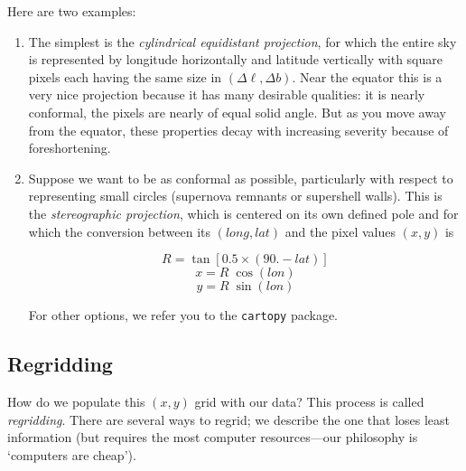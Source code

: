 \documentclass[psfig,preprint]{aastex}
\begin{document}
Here are two examples:
\begin{enumerate}

\item The simplest is the {\it cylindrical
equidistant projection}, for which the entire sky is represented by
longitude horizontally and latitude vertically with square pixels each
having the same size in $(\Delta \ell, \Delta b)$. Near the equator this
is a very nice projection because it has many desirable qualities: it
is nearly conformal, the pixels are nearly of equal solid angle. But as
you move away from the equator, these properties decay with increasing
severity because of foreshortening.

\item Suppose we want to be as conformal as possible, particularly with
  respect to representing small circles (supernova remnants or
  supershell walls). This is the {\it stereographic projection}, which
  is centered on its own defined pole and for which the conversion
  between its $(long, lat)$ and the pixel values $(x,y)$ is
%
\begin {mathletters}
\begin{equation}
   R = \tan[ 0.5 \times (90.-lat)] 
\end{equation}
\begin{equation}
   x= R \; \cos(lon) 
\end{equation}
\begin{equation}
   y= R \; \sin(lon) 
\end{equation}
\end {mathletters}
\noindent
For other options, we refer you to the \texttt{cartopy} package.

\end{enumerate}

\subsection{Regridding}

\noindent
How do we populate this $(x,y)$ grid
with our data? This process is called {\it regridding}. There are
several ways to regrid; we describe the one that loses least
information (but requires the most computer resources---our
philosophy is `computers are cheap').
\end{document}
